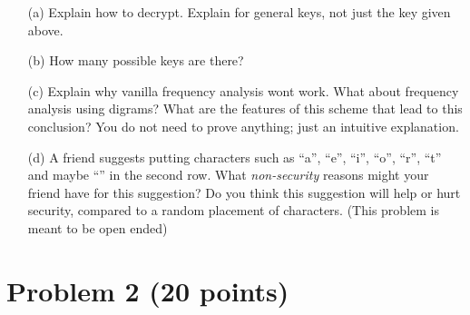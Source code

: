\begin{itemize}
	\item[(a)] Explain how to decrypt. Explain for general keys, not just the key given above.
	\item[(b)] How many possible keys are there?
	\item[(c)] Explain why vanilla frequency analysis wont work. What about frequency analysis using digrams? What are the features of this scheme that lead to this conclusion? You do not need to prove anything; just an intuitive explanation. 
	\item[(d)] A friend suggests putting characters such as ``a'', ``e'', ``i'', ``o'', ``r'', ``t'' and maybe ``\textunderscore'' in the second row. What \emph{non-security} reasons might your friend have for this suggestion? Do you think this suggestion will help or hurt security, compared to a random placement of characters. (This problem is meant to be open ended)
\end{itemize}


\section{Problem 2 (20 points)}

